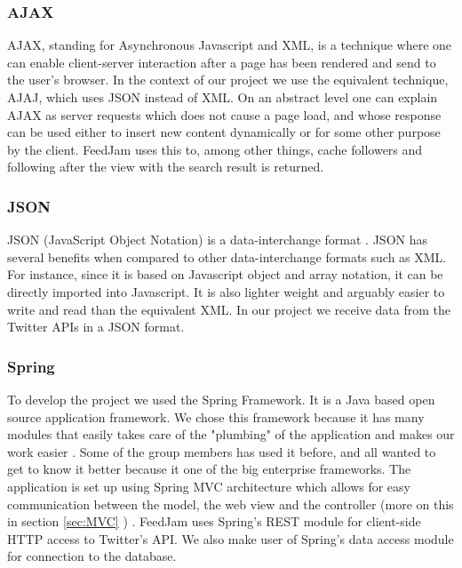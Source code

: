 \subsubsection{AJAX}%
AJAX, standing for Asynchronous Javascript and XML, is a technique where one can enable client-server interaction after a page has been rendered and send to the user's browser. In the context of our project we use the equivalent technique, AJAJ, which uses JSON instead of XML. On an abstract level one can explain AJAX as server requests which does not cause a page load, and whose response can be used either to insert new content dynamically or for some other purpose by the client. FeedJam uses this to, among other things, cache followers and following after the view with the search result is returned. 

\subsubsection{JSON}
JSON (JavaScript Object Notation) is a data-interchange format \cite{Crockford2011}. JSON has several benefits when compared to other data-interchange formats such as XML. For instance, since it is based on Javascript object and array notation, it can be directly imported into Javascript. It is also lighter weight and arguably easier to write and read than the equivalent XML. In our project we receive data from the Twitter APIs in a JSON format.

\subsubsection{Spring} %
To develop the project we used the Spring Framework. It is a Java based open source application framework. We chose this framework because it has many modules that easily takes care of the "plumbing" of the application and makes our work easier \citep{SpringSourcea}. Some of the group members has used it before, and all wanted to get to know it better because it one of the big enterprise frameworks. The application is set up using Spring MVC architecture which allows for easy communication between the model, the web view and the controller (more on this in section \ref{sec:MVC} ) \citep{SpringSourced}. FeedJam uses Spring's REST module for client-side HTTP access to Twitter's API. We also make user of Spring's data access module for connection to the database.
